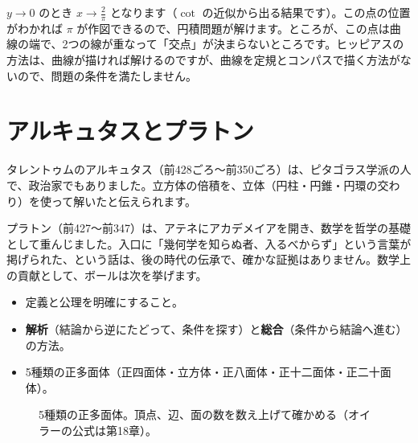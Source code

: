 \documentclass[a4paper,11pt,openany]{ltjsbook}
\begin{document}
$y\to 0$ のとき $x\to \tfrac{2}{\pi}$ となります（$\cot$ の近似から出る結果です）。この点の位置がわかれば $\pi$ が作図できるので、円積問題が解けます。ところが、この点は曲線の端で、2つの線が重なって「交点」が決まらないところです。ヒッピアスの方法は、曲線が描ければ解けるのですが、曲線を定規とコンパスで描く方法がないので、問題の条件を満たしません。

\section{アルキュタスとプラトン}

タレントゥムのアルキュタス（前428ごろ〜前350ごろ）は、ピタゴラス学派の人で、政治家でもありました。立方体の倍積を、立体（円柱・円錐・円環の交わり）を使って解いたと伝えられます。

プラトン（前427〜前347）は、アテネにアカデメイアを開き、数学を哲学の基礎として重んじました。入口に「幾何学を知らぬ者、入るべからず」という言葉が掲げられた、という話は、後の時代の伝承で、確かな証拠はありません。数学上の貢献として、ボールは次を挙げます。

\begin{itemize}[leftmargin=*]
\item 定義と公理を明確にすること。
\item \textbf{解析}（結論から逆にたどって、条件を探す）と\textbf{総合}（条件から結論へ進む）の方法。
\item 5種類の正多面体（正四面体・立方体・正八面体・正十二面体・正二十面体）。
\end{itemize}

\begin{figure}[htbp]
\centering
{}
\caption{5種類の正多面体。頂点、辺、面の数を数え上げて確かめる（オイラーの公式は第18章）。}
\end{figure}
\end{document}
